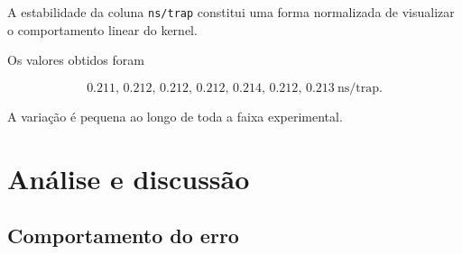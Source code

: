 \begin{center}
\end{center}

A estabilidade da coluna \texttt{ns/trap} constitui uma forma normalizada
de visualizar o comportamento linear do kernel.

Os valores obtidos foram

\begin{equation}
    0.211,\,
    0.212,\,
    0.212,\,
    0.212,\,
    0.214,\,
    0.212,\,
    0.213
    \ \text{ns/trap}.
\end{equation}

A variação é pequena ao longo de toda a faixa experimental.


\section{Análise e discussão}

\label{sec:atvd04-discussao}

\subsection{Comportamento do erro}

